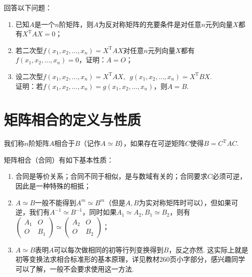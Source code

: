 \begin{example}
    回答以下问题：
    \begin{enumerate}
        \item 已知$A$是一个$n$阶矩阵，则$A$为反对称矩阵的充要条件是对任意$n$元列向量$X$都有$X^\mathrm{T}AX=0$；

        \item 若二次型$f(x_1,x_2,\ldots,x_n)=X^\mathrm{T}AX$对任意$n$元列向量$X$都有$f(x_1,x_2,\ldots,x_n)=0$，证明：$A=O$；

        \item 设二次型$f(x_1,x_2,\ldots,x_n)=X^\mathrm{T}AX,\enspace g(x_1,x_2,\ldots,x_n)=X^\mathrm{T}BX$.\\
              证明：若$f(x_1,x_2,\ldots,x_n)=g(x_1,x_2,\ldots,x_n)$，则$A=B$.
    \end{enumerate}
\end{example}

\section{矩阵相合的定义与性质}

\begin{definition}
    我们称$n$阶矩阵$A$相合于$B$（记作$A\simeq B$），如果存在可逆矩阵$C$使得$B=C^\mathrm{T}AC$.
\end{definition}
矩阵相合（合同）有如下基本性质：
\begin{enumerate}
    \item 合同是等价关系；合同不同于相似，是与数域有关的；合同要求$C$必须可逆，因此是一种特殊的相抵；

    \item $A\simeq B$一般不能得到$A^m\simeq B^m$（但是$A,B$为实对称矩阵时可以），但如果可逆，我们有$A^{-1}\simeq B^{-1}$，同时如果$A_1\simeq A_2,B_1\simeq B_2$，则有$\begin{pmatrix}
                  A_1 & O \\ O & B_1
              \end{pmatrix}\simeq\begin{pmatrix}
                  A_2 & O \\ O & B_2
              \end{pmatrix}$；

    \item $A\simeq B$表明$A$可以每次做相同的初等行列变换得到$B$，反之亦然. 这实际上就是初等变换法求相合标准形的基本原理，详见教材260页小字部分，感兴趣同学可以了解，一般不会要求使用这一方法.
\end{enumerate}

